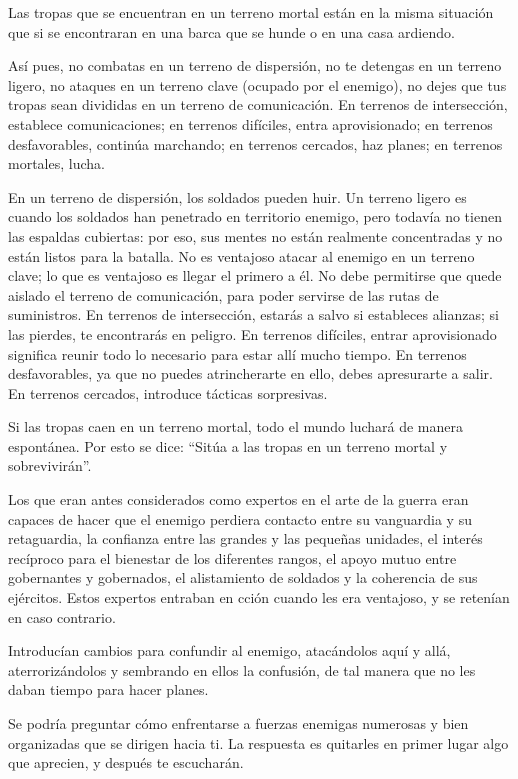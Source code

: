 Las tropas que se encuentran en un terreno mortal están en la misma situación que si se encontraran en una barca que se hunde o en una casa ardiendo.

Así pues, no combatas en un terreno de dispersión, no te detengas en un terreno ligero, no ataques en un terreno clave (ocupado por el enemigo), no dejes que tus tropas sean divididas en un terreno de comunicación. En terrenos de intersección, establece comunicaciones; en terrenos difíciles, entra aprovisionado; en terrenos desfavorables, continúa marchando; en terrenos cercados, haz planes; en terrenos mortales, lucha.

En un terreno de dispersión, los soldados pueden huir. Un terreno ligero es cuando los soldados han penetrado en territorio enemigo, pero todavía no tienen las espaldas cubiertas: por eso, sus mentes no están realmente concentradas y no están listos para la batalla. No es ventajoso atacar al enemigo en un terreno clave; lo que es ventajoso es llegar el primero a él. No debe permitirse que quede aislado el terreno de comunicación, para poder servirse de las rutas de suministros. En terrenos de intersección, estarás a salvo si estableces alianzas; si las pierdes, te encontrarás en peligro. En terrenos difíciles, entrar aprovisionado significa reunir todo lo necesario para estar allí mucho tiempo. En terrenos desfavorables, ya que no puedes atrincherarte en ello, debes apresurarte a salir. En terrenos cercados, introduce tácticas sorpresivas.

Si las tropas caen en un terreno mortal, todo el mundo luchará de manera espontánea. Por esto se dice: ``Sitúa a las tropas en un terreno mortal y sobrevivirán''.

Los que eran antes considerados como expertos en el arte de la guerra eran capaces de hacer que el enemigo perdiera contacto entre su vanguardia y su retaguardia, la confianza entre las grandes y las pequeñas unidades, el interés recíproco para el bienestar de los diferentes rangos, el apoyo mutuo entre gobernantes y gobernados, el alistamiento de soldados y la coherencia de sus ejércitos. Estos expertos entraban en cción cuando les era ventajoso, y se retenían en caso contrario.

Introducían cambios para confundir al enemigo, atacándolos aquí y allá, aterrorizándolos y sembrando en ellos la confusión, de tal manera que no les daban tiempo para hacer planes.

Se podría preguntar cómo enfrentarse a fuerzas enemigas numerosas y bien organizadas que se dirigen hacia ti. La respuesta es quitarles en primer lugar algo que aprecien, y después te escucharán.

